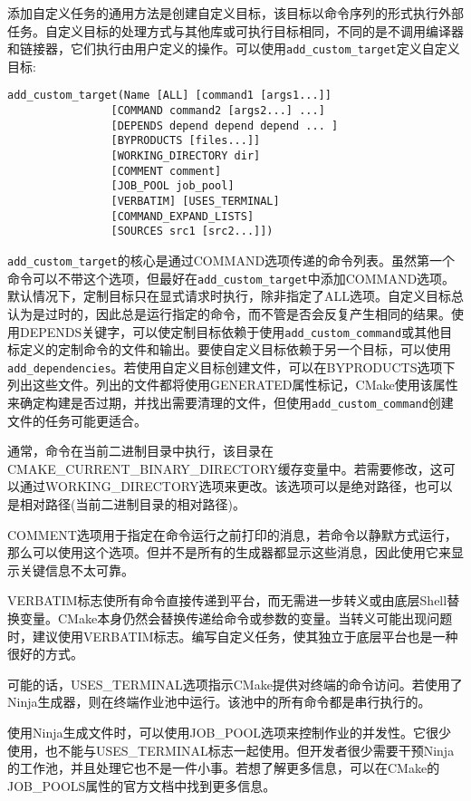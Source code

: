 


添加自定义任务的通用方法是创建自定义目标，该目标以命令序列的形式执行外部任务。自定义目标的处理方式与其他库或可执行目标相同，不同的是不调用编译器和链接器，它们执行由用户定义的操作。可以使用\texttt{add\_custom\_target}定义自定义目标:

\begin{lstlisting}[style=styleCMake]
add_custom_target(Name [ALL] [command1 [args1...]]
				[COMMAND command2 [args2...] ...]
				[DEPENDS depend depend depend ... ]
				[BYPRODUCTS [files...]]
				[WORKING_DIRECTORY dir]
				[COMMENT comment]
				[JOB_POOL job_pool]
				[VERBATIM] [USES_TERMINAL]
				[COMMAND_EXPAND_LISTS]
				[SOURCES src1 [src2...]])
\end{lstlisting}

\texttt{add\_custom\_target}的核心是通过COMMAND选项传递的命令列表。虽然第一个命令可以不带这个选项，但最好在\texttt{add\_custom\_target}中添加COMMAND选项。默认情况下，定制目标只在显式请求时执行，除非指定了ALL选项。自定义目标总认为是过时的，因此总是运行指定的命令，而不管是否会反复产生相同的结果。使用DEPENDS关键字，可以使定制目标依赖于使用\texttt{add\_custom\_command}或其他目标定义的定制命令的文件和输出。要使自定义目标依赖于另一个目标，可以使用\texttt{add\_dependencies}。若使用自定义目标创建文件，可以在BYPRODUCTS选项下列出这些文件。列出的文件都将使用GENERATED属性标记，CMake使用该属性来确定构建是否过期，并找出需要清理的文件，但使用\texttt{add\_custom\_command}创建文件的任务可能更适合。

通常，命令在当前二进制目录中执行，该目录在CMAKE\_CURRENT\_BINARY\_DIRECTORY缓存变量中。若需要修改，这可以通过WORKING\_DIRECTORY选项来更改。该选项可以是绝对路径，也可以是相对路径(当前二进制目录的相对路径)。

COMMENT选项用于指定在命令运行之前打印的消息，若命令以静默方式运行，那么可以使用这个选项。但并不是所有的生成器都显示这些消息，因此使用它来显示关键信息不太可靠。

VERBATIM标志使所有命令直接传递到平台，而无需进一步转义或由底层Shell替换变量。CMake本身仍然会替换传递给命令或参数的变量。当转义可能出现问题时，建议使用VERBATIM标志。编写自定义任务，使其独立于底层平台也是一种很好的方式。

可能的话，USES\_TERMINAL选项指示CMake提供对终端的命令访问。若使用了Ninja生成器，则在终端作业池中运行。该池中的所有命令都是串行执行的。

使用Ninja生成文件时，可以使用JOB\_POOL选项来控制作业的并发性。它很少使用，也不能与USES\_TERMINAL标志一起使用。但开发者很少需要干预Ninja的工作池，并且处理它也不是一件小事。若想了解更多信息，可以在CMake的JOB\_POOLS属性的官方文档中找到更多信息。

